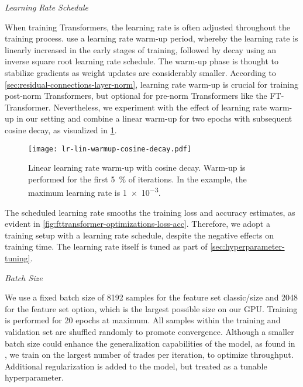 \emph{Learning Rate Schedule}

When training Transformers, the learning rate is often adjusted throughout the training process. \textcite[][6007]{vaswaniAttentionAllYou2017} use a learning rate warm-up period, whereby the learning rate is linearly increased in the early stages of training, followed by decay using an inverse square root learning rate schedule. The warm-up phase is thought to stabilize gradients as weight updates are considerably smaller. According to \cref{sec:residual-connections-layer-norm}, learning rate warm-up is crucial for training post-norm Transformers, but optional for pre-norm Transformers like the FT-Transformer. Nevertheless, we experiment with the effect of learning rate warm-up in our setting and combine a linear warm-up for two epochs with subsequent cosine decay, as visualized in \cref{fig:lr-lin-warmup-cosine-decay}.

\begin{figure}[!ht]
    \centering
    \texttt{[image: lr-lin-warmup-cosine-decay.pdf]}
    \caption[Linear Learning Rate Warm-Up With Cosine Decay]{Linear learning rate warm-up with cosine decay. Warm-up is performed for the first \SI{5}{\percent} of iterations. In the example, the maximum learning rate is \num{1e-3}.}
    \label{fig:lr-lin-warmup-cosine-decay}
\end{figure}

The scheduled learning rate smooths the training loss and accuracy estimates, as evident in \cref{fig:fttransformer-optimizations-loss-acc}. Therefore, we adopt a training setup with a learning rate schedule, despite the negative effects on training time. The learning rate itself is tuned as part of \cref{sec:hyperparameter-tuning}.


\emph{Batch Size}

We use a fixed batch size of \num{8192} samples for the feature set classic/size and \num{2048} for the feature set option, which is the largest possible size on our \gls{GPU}. Training is performed for \num{20} epochs at maximum. All samples within the training and validation set are shuffled randomly to promote convergence. Although a smaller batch size could enhance the generalization capabilities of the model, as found in \textcite[\checkmark][3]{keskarLargeBatchTrainingDeep2017}, we train on the largest number of trades per iteration, to optimize throughput. Additional regularization is added to the model, but treated as a tunable hyperparameter.

